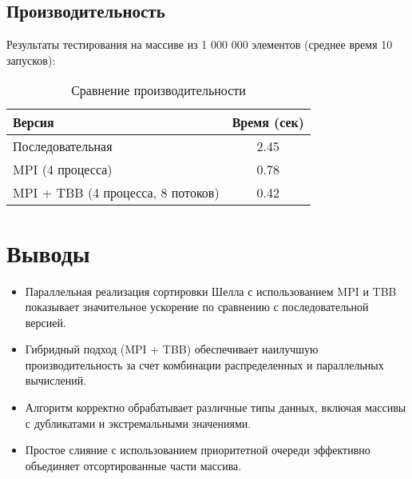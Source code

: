 \documentclass[12pt]{article}
\begin{document}
\subsection{Производительность}
Результаты тестирования на массиве из 1 000 000 элементов (среднее время 10 запусков):
\begin{table}[h]
\centering
\begin{tabular}{|l|c|}
\hline
\textbf{Версия} & \textbf{Время (сек)} \\ \hline
Последовательная & 2.45 \\ \hline
MPI (4 процесса) & 0.78 \\ \hline
MPI + TBB (4 процесса, 8 потоков) & 0.42 \\ \hline
\end{tabular}
\caption{Сравнение производительности}
\label{tab:performance}
\end{table}

\section{Выводы}
\begin{itemize}
\item Параллельная реализация сортировки Шелла с использованием MPI и TBB показывает значительное ускорение по сравнению с последовательной версией.
\item Гибридный подход (MPI + TBB) обеспечивает наилучшую производительность за счет комбинации распределенных и параллельных вычислений.
\item Алгоритм корректно обрабатывает различные типы данных, включая массивы с дубликатами и экстремальными значениями.
\item Простое слияние с использованием приоритетной очереди эффективно объединяет отсортированные части массива.
\end{itemize}
\end{document}
